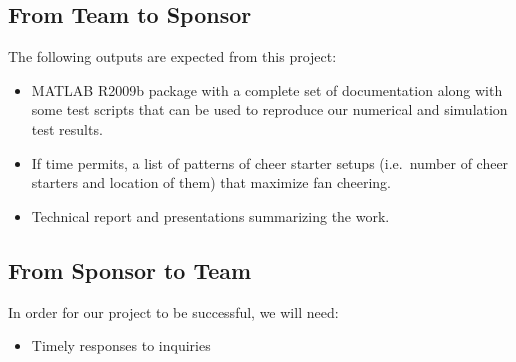 \documentclass[12pt,letterpaper]{article}
\theoremstyle{definition}
\begin{document}
\subsection{From Team to Sponsor} %
The following outputs are expected from this project:
\begin{itemize}
    \item MATLAB R2009b package with a complete set of documentation along with some test 
        scripts that can be used to reproduce our numerical and simulation test
        results.
    \item If time permits, a list of patterns of cheer starter setups (i.e.~number of cheer starters and location of them) that maximize fan cheering.
    \item Technical report and presentations summarizing the work. 
\end{itemize}

\subsection{From Sponsor to Team} %

In order for our project to be successful, we will need:
\begin{itemize}
    \item Timely responses to inquiries 
\end{itemize}


\newpage



%
\end{document}
